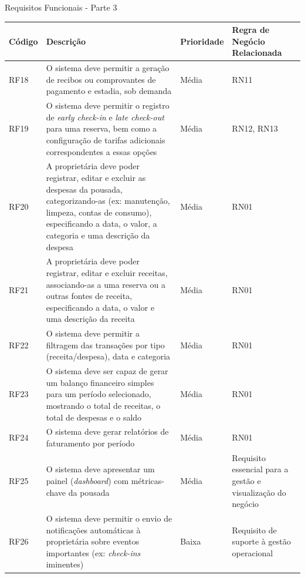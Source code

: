 \documentclass[
	12pt,				%
	openany,			%
	oneside,			%
	a4paper,			%
	english,			%
	french,				%
	spanish,			%
	brazil				%
	]{abntex2}
\begin{document}
\begin{quadro}[H]
	\caption{Requisitos Funcionais - Parte 3}
	\label{quadro_rf3}
	\begin{tabular}{|>{\centering\arraybackslash}p{1.5cm}|p{6.7cm}|>{\centering\arraybackslash}p{2cm}|>{\centering\arraybackslash}p{4cm}|}
		\hline
		\textbf{Código} & \textbf{Descrição} & \textbf{Prioridade} & \textbf{Regra de Negócio Relacionada} \\ \hline
		RF18 & O sistema deve permitir a geração de recibos ou comprovantes de pagamento e estadia, sob demanda & Média & RN11 \\ \hline
		RF19 & O sistema deve permitir o registro de \textit{early check-in} e \textit{late check-out} para uma reserva, bem como a configuração de tarifas adicionais correspondentes a essas opções & Média & RN12, RN13  \\ \hline
		RF20 & A proprietária deve poder registrar, editar e excluir as despesas da pousada, categorizando-as (ex: manutenção, limpeza, contas de consumo), especificando a data, o valor, a categoria e uma descrição da despesa & Média & RN01 
		\\ \hline
		RF21 & A proprietária deve poder registrar, editar e excluir receitas, associando-as a uma reserva ou a outras fontes de receita, especificando a data, o valor e uma descrição da receita & Média & RN01 \\ \hline
		RF22 & O sistema deve permitir a filtragem das transações por tipo (receita/despesa), data e categoria & Média & RN01 \\ \hline
		RF23 & O sistema deve ser capaz de gerar um balanço financeiro simples para um período selecionado, mostrando o total de receitas, o total de despesas e o saldo & Média & RN01 \\ \hline
		RF24 & O sistema deve gerar relatórios de faturamento por período & Média & RN01 \\ \hline
		RF25 & O sistema deve apresentar um painel (\textit{dashboard}) com métricas-chave da pousada & Média & Requisito essencial para a gestão e visualização do negócio \\ \hline
		RF26 & O sistema deve permitir o envio de notificações automáticas à proprietária sobre eventos importantes (ex: \textit{check-ins} iminentes)
		& Baixa & Requisito de suporte à gestão operacional \\ \hline
	\end{tabular}
\end{quadro}
%
\end{document}
